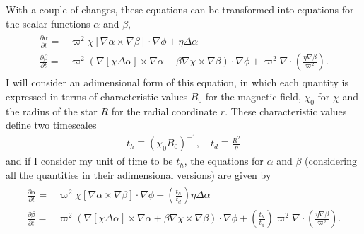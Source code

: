 \documentclass[letterpaper,10pt]{article}
\newcommand{\pp}{\partial}
\begin{document}
With a couple of changes, these equations can be transformed into equations for the scalar functions $\alpha$ and $\beta$,
\begin{eqnarray}
\begin{aligned}
\frac{\pp\alpha}{\pp t}=&\varpi^2\chi[\nabla\alpha\times\nabla\beta]\cdot\nabla\phi+\eta\Delta\alpha\\
\frac{\pp \beta}{\pp t}=&\varpi^2(\nabla[\chi\Delta\alpha]\times\nabla\alpha+\beta\nabla\chi\times\nabla\beta)\cdot\nabla\phi+\varpi^2\nabla\cdot\left(\frac{\eta\nabla\beta}{\varpi^2}\right).
\end{aligned}
\end{eqnarray}
I will consider an adimensional form of this equation, in which each quantity is expressed in terms of characteristic values $B_0$ for the magnetic field, $\chi_0$ for $\chi$ and the radius of the star $R$ for the radial coordinate $r$. These characteristic values define two timescales
\begin{eqnarray}
t_h\equiv(\chi_0B_0)^{-1},\quad t_d\equiv\frac{R^2}{\eta}
\end{eqnarray}
and if I consider my unit of time to be $t_h$, the equations for $\alpha$ and $\beta$ (considering all the quantities in their adimensional versions) are given by
\begin{eqnarray}
\begin{aligned}
\frac{\pp\alpha}{\pp t}=&\varpi^2\chi[\nabla\alpha\times\nabla\beta]\cdot\nabla\phi+\left(\frac{t_h}{t_d}\right)\eta\Delta\alpha\\
\frac{\pp \beta}{\pp t}=&\varpi^2(\nabla[\chi\Delta\alpha]\times\nabla\alpha+\beta\nabla\chi\times\nabla\beta)\cdot\nabla\phi+\left(\frac{t_h}{t_d}\right)\varpi^2\nabla\cdot\left(\frac{\eta\nabla\beta}{\varpi^2}\right).
\end{aligned}\label{intro::eqs}
\end{eqnarray}
\end{document}
